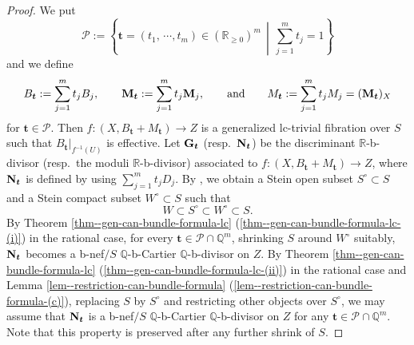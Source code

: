 \documentclass[12pt]{amsart}
\theoremstyle{definition}
\begin{document}
\begin{proof}
We put
$$\mathcal{P}:=\left\{\boldsymbol{t}=(t_{1},\,\cdots, t_{m})\in (\mathbb{R}_{\geq 0})^{m}\,\middle| \,\sum_{j=1}^{m}t_{j}=1\right\}$$
and we define 
$$B_{\boldsymbol{t}}:=\sum_{j=1}^{m}t_{j}B_{j}, \qquad \boldsymbol{\rm M}_{\boldsymbol{t}}:=\sum_{j=1}^{m}t_{j}\boldsymbol{\rm M}_{j}, \qquad {\rm and} \qquad M_{\boldsymbol{t}}:=\sum_{j=1}^{m}t_{j}M_{j}=(\boldsymbol{\rm M}_{\boldsymbol{t}})_{X}$$
for $\boldsymbol{t} \in \mathcal{P}$. 
Then $f \colon (X, B_{\boldsymbol{t}}+M_{\boldsymbol{t}}) \to Z$ is a generalized lc-trivial fibration over $S$ such that $B_{\boldsymbol{t}}|_{f^{-1}(U)}$ is effective. 
Let $\boldsymbol{\rm G}_{\boldsymbol{t}}$ (resp.~$\boldsymbol{\rm N}_{\boldsymbol{t}}$) be the discriminant $\mathbb{R}$-b-divisor (resp.~the moduli $\mathbb{R}$-b-divisor) associated to $f \colon (X, B_{\boldsymbol{t}}+M_{\boldsymbol{t}}) \to Z$, where $\boldsymbol{\rm N}_{\boldsymbol{t}}$ is defined by using $\sum_{j=1}^{m}t_{j}D_{j}$. 
By \cite[Lemma 2.16]{fujino-analytic-bchm}, we obtain a Stein open subset $S^{\circ}\subset S$ and a Stein compact subset $W^{\circ}\subset S$ such that
$$W \subset S^{\circ} \subset W^{\circ} \subset S.$$
By Theorem \ref{thm--gen-can-bundle-formula-lc} (\ref{thm--gen-can-bundle-formula-lc-(i)}) in the rational case, for every $\boldsymbol{t} \in \mathcal{P} \cap {\mathbb{Q}}^{m}$, shrinking $S$ around $W^{\circ}$ suitably, $\boldsymbol{\rm N}_{\boldsymbol{t}}$ becomes a b-nef$/S$ $\mathbb{Q}$-b-Cartier $\mathbb{Q}$-b-divisor on $Z$. 
By Theorem \ref{thm--gen-can-bundle-formula-lc} (\ref{thm--gen-can-bundle-formula-lc-(ii)}) in the rational case and Lemma \ref{lem--restriction-can-bundle-formula} (\ref{lem--restriction-can-bundle-formula-(c)}), replacing $S$ by $S^{\circ}$ and restricting other objects over $S^{\circ}$, we may assume that $\boldsymbol{\rm N}_{\boldsymbol{t}}$ is a b-nef$/S$ $\mathbb{Q}$-b-Cartier $\mathbb{Q}$-b-divisor  on $Z$ for any $\boldsymbol{t} \in \mathcal{P} \cap {\mathbb{Q}}^{m}$. 
Note that this property is preserved after any further shrink of $S$. 


\end{proof}
\end{document}
